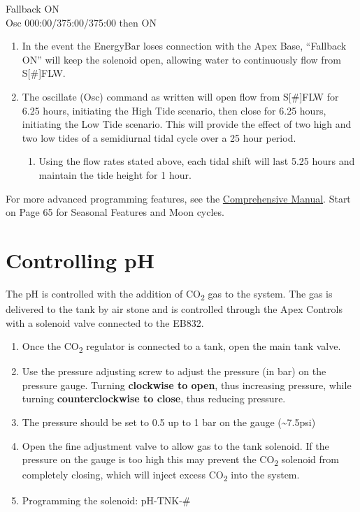 \documentclass[]{book}
\providecommand{\tightlist}{%
  \setlength{\itemsep}{0pt}\setlength{\parskip}{0pt}}
\begin{document}
Fallback ON\\
Osc 000:00/375:00/375:00 then ON

\begin{enumerate}
\def\labelenumi{\arabic{enumi}.}
\tightlist
\item
  In the event the EnergyBar loses connection with the Apex Base,
  ``Fallback ON'' will keep the solenoid open, allowing water to
  continuously flow from S{[}\#{]}FLW.\\
\item
  The oscillate (Osc) command as written will open flow from
  S{[}\#{]}FLW for 6.25 hours, initiating the High Tide scenario, then
  close for 6.25 hours, initiating the Low Tide scenario. This will
  provide the effect of two high and two low tides of a semidiurnal
  tidal cycle over a 25 hour period.

  \begin{enumerate}
  \def\labelenumii{\arabic{enumii}.}
  \tightlist
  \item
    Using the flow rates stated above, each tidal shift will last 5.25
    hours and maintain the tide height for 1 hour.
  \end{enumerate}
\end{enumerate}

For more advanced programming features, see the
\href{https://github.com/SilbigerLab/Mesocosm_User_Manual/tree/7503b88686aef920c4a4ed473b1efe37b34dae10/Manuals/Apex_Comprehensive_Reference_Manual.pdf}{Comprehensive
Manual}. Start on Page 65 for Seasonal Features and Moon cycles.

\chapter{Controlling pH}\label{controlling-ph}

The pH is controlled with the addition of CO\textsubscript{2} gas to the
system. The gas is delivered to the tank by air stone and is controlled
through the Apex Controls with a solenoid valve connected to the EB832.

\begin{enumerate}
\def\labelenumi{\arabic{enumi}.}
\tightlist
\item
  Once the CO\textsubscript{2} regulator is connected to a tank, open
  the main tank valve.
\item
  Use the pressure adjusting screw to adjust the pressure (in bar) on
  the pressure gauge. Turning \textbf{clockwise to open}, thus
  increasing pressure, while turning \textbf{counterclockwise to close},
  thus reducing pressure.
\item
  The pressure should be set to 0.5 up to 1 bar on the gauge
  (\textasciitilde{}7.5psi)
\item
  Open the fine adjustment valve to allow gas to the tank solenoid. If
  the pressure on the gauge is too high this may prevent the
  CO\textsubscript{2} solenoid from completely closing, which will
  inject excess CO\textsubscript{2} into the system.
\item
  Programming the solenoid: pH-TNK-\#
\end{enumerate}
\end{document}

